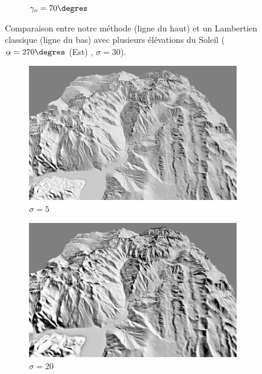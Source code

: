 \begin{figure}[h!]
\begin{subfigure}[t]{0.24\linewidth}
   \caption{$\gamma_o = 70\degres$}
 \end{subfigure}
 \caption{Comparaison entre notre méthode (ligne du haut) et un Lambertien classique (ligne du bas) avec plusieurs élévations du Soleil ( $\alpha = 270\degres$ (Est) , $\sigma = 30$). }
\end{figure}



\begin{figure}[h!]
\centering
 \begin{subfigure}[t]{0.24\linewidth}
   \centering
   \includegraphics[width=1.0\linewidth]{Resultats/4_our_5.png}
   \caption{$\sigma = 5$}
 \end{subfigure}
 \begin{subfigure}[t]{0.24\linewidth}
   \centering
   \includegraphics[width=1.0\linewidth]{Resultats/4_our_20.png}
   \caption{$\sigma = 20$}
 \end{subfigure}
 \begin{subfigure}[t]{0.24\linewidth}

\end{subfigure}
\end{figure}
